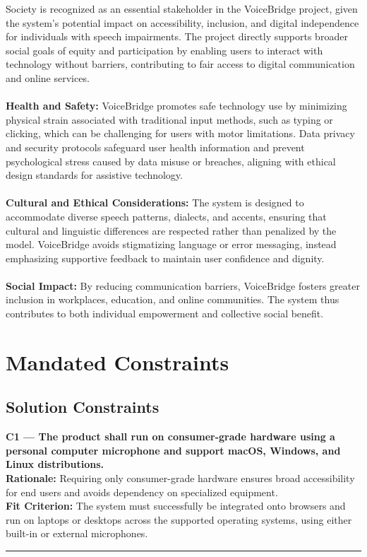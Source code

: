 \documentclass[11pt]{article}
\begin{document}
Society is recognized as an essential stakeholder in the VoiceBridge project, given the system’s potential impact on accessibility, inclusion, and digital independence for individuals with speech impairments. The project directly supports broader social goals of equity and participation by enabling users to interact with technology without barriers, contributing to fair access to digital communication and online services.
\\\\
\textbf{Health and Safety:} 
VoiceBridge promotes safe technology use by minimizing physical strain associated with traditional input methods, such as typing or clicking, which can be challenging for users with motor limitations. Data privacy and security protocols safeguard user health information and prevent psychological stress caused by data misuse or breaches, aligning with ethical design standards for assistive technology.
\\\\
\textbf{Cultural and Ethical Considerations:} 
The system is designed to accommodate diverse speech patterns, dialects, and accents, ensuring that cultural and linguistic differences are respected rather than penalized by the model. VoiceBridge avoids stigmatizing language or error messaging, instead emphasizing supportive feedback to maintain user confidence and dignity.
\\\\
\textbf{Social Impact:} 
By reducing communication barriers, VoiceBridge fosters greater inclusion in workplaces, education, and online communities. The system thus contributes to both individual empowerment and collective social benefit.

\section{Mandated Constraints}

\subsection{Solution Constraints}

\noindent\textbf{C1 — The product shall run on consumer-grade hardware using a personal computer microphone and support macOS, Windows, and Linux distributions.}\\
\textbf{Rationale:} Requiring only consumer-grade hardware ensures broad accessibility for end users and avoids dependency on specialized equipment.\\
\textbf{Fit Criterion:} The system must successfully be integrated onto browsers and run on laptops or desktops across the supported operating systems, using either built-in or external microphones.
\par\noindent\rule{\textwidth}{0.4pt}
\end{document}
